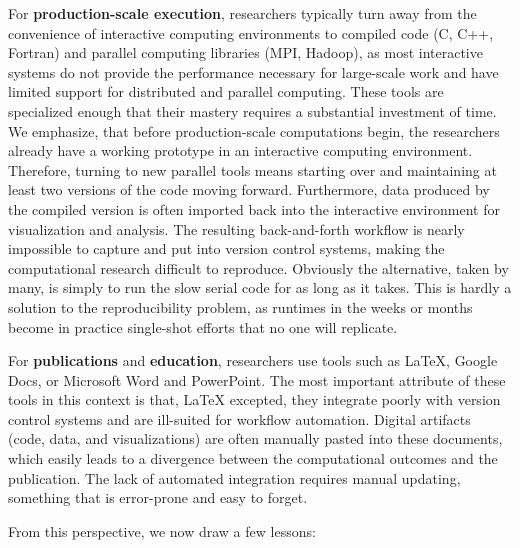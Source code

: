 \documentclass[11pt,oneside,english]{article}
\begin{document}
For \textbf{production-scale execution}, researchers typically turn away from
the convenience of interactive computing environments to compiled code (C, C++,
Fortran) and parallel computing libraries (MPI, Hadoop), as most interactive
systems do not provide the performance necessary for large-scale work and have
limited support for distributed and parallel computing.  These tools are
specialized enough that their mastery requires a substantial investment of
time. We emphasize, that before production-scale computations begin, the
researchers already have a working prototype in an interactive computing
environment. Therefore, turning to new parallel tools means starting over and
maintaining at least two versions of the code moving forward.  Furthermore,
data produced by the compiled version is often imported back into the
interactive environment for visualization and analysis. The resulting
back-and-forth workflow is nearly impossible to capture and put into version
control systems, making the computational research difficult to reproduce.
Obviously the alternative, taken by many, is simply to run the slow serial code
for as long as it takes.  This is hardly a solution to the reproducibility
problem, as runtimes in the weeks or months become in practice single-shot
efforts that no one will replicate.

For \textbf{publications} and \textbf{education}, researchers use tools such as
\LaTeX{}, Google Docs, or Microsoft Word and PowerPoint.  The most important attribute
of these tools in this context is that, \LaTeX{} excepted, they integrate
poorly with version control systems and are ill-suited for workflow automation.
Digital artifacts (code, data, and visualizations) are often manually pasted
into these documents, which easily leads to a divergence between the
computational outcomes and the publication.  The lack of automated integration requires
manual updating, something that is error-prone and easy to forget.

From this perspective, we now draw a few lessons:
\end{document}
